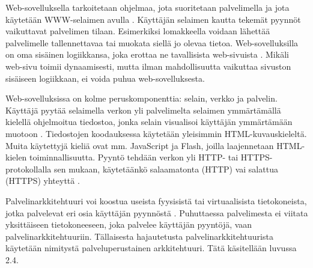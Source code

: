 Web-sovelluksella tarkoitetaan ohjelmaa, jota suoritetaan palvelimella ja jota käytetään WWW-selaimen avulla \cite{uml}. Käyttäjän selaimen kautta tekemät pyynnöt vaikuttavat palvelimen tilaan. Esimerkiksi lomakkeella voidaan lähettää palvelimelle tallennettavaa tai muokata siellä jo olevaa tietoa. Web-sovelluksilla on oma sisäinen logiikkansa, joka erottaa ne tavallisista web-sivuista \cite{uml}. Mikäli web-sivu toimii dynaamisesti, mutta ilman mahdollisuutta vaikuttaa sivuston sisäiseen logiikkaan, ei voida puhua web-sovelluksesta.

Web-sovelluksissa on kolme peruskomponenttia: selain, verkko ja palvelin. Käyttäjä pyytää selaimella verkon yli palvelimelta selaimen ymmärtämällä kielellä ohjelmoitua tiedostoa, jonka selain visualisoi käyttäjän ymmärtämään muotoon \cite{uml}. Tiedostojen koodauksessa käytetään yleisimmin HTML-kuvauskieleltä. Muita käytettyjä kieliä ovat mm. JavaScript ja Flash, joilla laajennetaan HTML-kielen toiminnallisuutta. Pyyntö tehdään verkon yli HTTP- tai HTTPS-protokollalla sen mukaan, käytetäänkö salaamatonta (HTTP) vai salattua (HTTPS) yhteyttä \cite{rfc2818}.

Palvelinarkkitehtuuri voi koostua useista fyysisistä tai virtuaalisista tietokoneista, jotka palvelevat eri osia käyttäjän pyynnöstä \cite{soa}. Puhuttaessa palvelimesta ei viitata yksittäiseen tietokoneeseen, joka palvelee käyttäjän pyyntöjä, vaan pal\-ve\-lin\-ark\-ki\-teh\-tuu\-riin. Tällaisesta hajautetusta palvelinarkkitehtuurista käytetään nimitystä palveluperustainen arkkitehtuuri. Tätä käsitellään luvussa 2.4.
